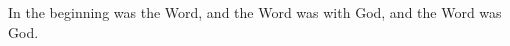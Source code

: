 
\bverse In the beginning was the Word, and the Word was with God, and the Word was God.
\bverse 
\bverse
\bverse
\bverse
\bverse
\bverse
\bverse
\bverse
\bverse
\bverse
\bverse
\bverse
\bverse
\bverse
\bverse
\bverse
\bverse
\bverse
\bverse
\bverse
\bverse
\bverse
\bverse
\bverse
\bverse
\bverse
\bverse
\bverse
\bverse
\bverse
\bverse
\bverse
\bverse
\bverse
\bverse
\bverse
\bverse
\bverse
\bverse
\bverse
\bverse
\bverse
\bverse
\bverse
\bverse
\bverse
\bverse
\bverse
\bverse
\bverse
